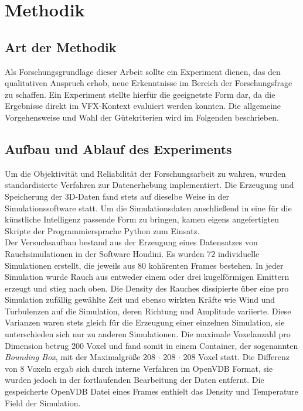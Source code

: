 \chapter{Methodik}
\thispagestyle{fancy}

\section{Art der Methodik}
Als Forschungsgrundlage dieser Arbeit sollte ein Experiment dienen, das den qualitativen Anspruch erhob, neue Erkenntnisse im Bereich der Forschungsfrage zu schaffen. Ein Experiment stellte hierfür die geeignetste Form dar, da die Ergebnisse direkt im VFX-Kontext evaluiert werden konnten. Die allgemeine Vorgehensweise und Wahl der Gütekriterien wird im Folgenden beschrieben.

\section{Aufbau und Ablauf des Experiments}
Um die Objektivität und Reliabilität der Forschungsarbeit zu wahren, wurden standardisierte Verfahren zur Datenerhebung implementiert. Die Erzeugung und Speicherung der 3D-Daten fand stets auf dieselbe Weise in der Simulationssoftware statt. Um die Simulationsdaten anschließend in eine für die künstliche Intelligenz passende Form zu bringen, kamen eigens angefertigten Skripte der Programmiersprache Python \parencite[]{python} zum Einsatz. \\

Der Versuchsaufbau bestand aus der Erzeugung eines Datensatzes von Rauchsimulationen in der Software Houdini. Es wurden 72 individuelle Simulationen erstellt, die jeweils aus 80 kohärenten Frames bestehen. In jeder Simulation wurde Rauch aus entweder einem oder drei kugelförmigen Emittern erzeugt und stieg nach oben. Die Density des Rauches dissipierte über eine pro Simulation zufällig gewählte Zeit und ebenso wirkten Kräfte wie Wind und Turbulenzen auf die Simulation, deren Richtung und Amplitude variierte. Diese Varianzen waren stets gleich für die Erzeugung einer einzelnen Simulation, sie unterschieden sich nur zu anderen Simulationen. Die maximale Voxelanzahl pro Dimension betrug 200 Voxel und fand somit in einem Container, der sogenannten \textit{Bounding Box}, mit der Maximalgröße 208 $\cdot$ 208 $\cdot$ 208 Voxel statt. Die Differenz von 8 Voxeln ergab sich durch interne Verfahren im OpenVDB Format, sie wurden jedoch in der fortlaufenden Bearbeitung der Daten entfernt. Die gespeicherte OpenVDB Datei eines Frames enthielt das Density und Temperature Field der Simulation.\\

